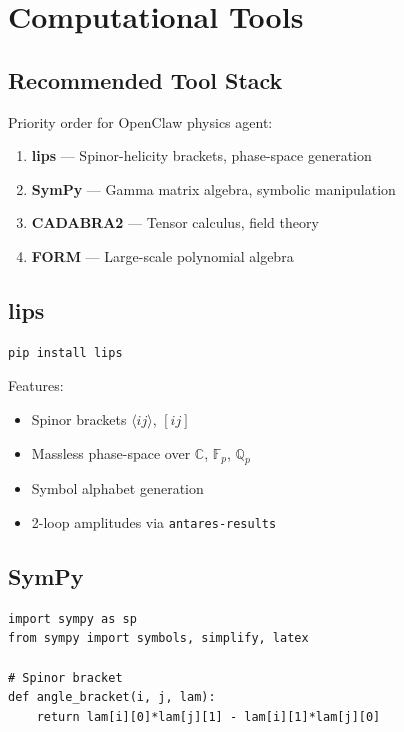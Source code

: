
\chapter{Computational Tools}
\label{ch:tools}

\section{Recommended Tool Stack}

Priority order for OpenClaw physics agent:

\begin{enumerate}
\item \textbf{lips} — Spinor-helicity brackets, phase-space generation
\item \textbf{SymPy} — Gamma matrix algebra, symbolic manipulation
\item \textbf{CADABRA2} — Tensor calculus, field theory
\item \textbf{FORM} — Large-scale polynomial algebra
\end{enumerate}

\section{lips}

\begin{verbatim}
pip install lips
\end{verbatim}

Features:
\begin{itemize}
\item Spinor brackets $\langle ij \rangle$, $[ij]$
\item Massless phase-space over $\mathbb{C}$, $\mathbb{F}_p$, $\mathbb{Q}_p$
\item Symbol alphabet generation
\item 2-loop amplitudes via \texttt{antares-results}
\end{itemize}

\section{SymPy}

\begin{verbatim}
import sympy as sp
from sympy import symbols, simplify, latex

# Spinor bracket
def angle_bracket(i, j, lam):
    return lam[i][0]*lam[j][1] - lam[i][1]*lam[j][0]
\end{verbatim}


